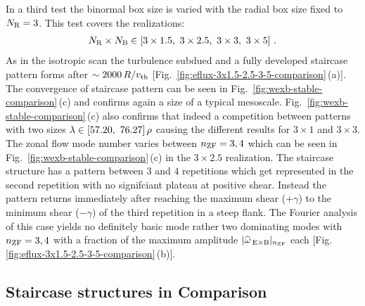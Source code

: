 In a third test the binormal box size is varied with the radial box size fixed to $N_\mathrm{R} = 3$.
This test covers the realizations:
\begin{gather*}
	N_\mathrm{R} \times N_\mathrm{B} \in [3\times1.5,~3\times2.5,~3\times3,~3\times5]~.
\end{gather*}
As in the isotropic scan the turbulence subdued and a fully developed staircase pattern forms after $\sim 2000\,R/v_{\mathrm{th}}$ [Fig.~\ref{fig:eflux-3x1.5-2.5-3-5-comparison}\,(a)]. The convergence of staircase pattern can be seen in Fig.~\ref{fig:wexb-stable-comparison}\,(c) and confirms again a size of a typical mesoscale. Fig.~\ref{fig:wexb-stable-comparison}\,(c) also confirms that indeed a competition between patterns with two sizes $\lambda \in [57.20,~ 76.27]\,\rho$ causing the different results for $3 \times 1$ and $3\times 3$. The zonal flow mode number varies between $n_\mathrm{ZF} = 3,4$ which can be seen in Fig.~\ref{fig:wexb-stable-comparison}\,(c) in the $3\times 2.5$ realization. The staircase structure has a pattern between $3$ and $4$ repetitions which get represented in the second repetition with no signifciant plateau at positive shear. Instead the pattern returns immediately after reaching the maximum shear ($+ \gamma$) to the minimum shear ($- \gamma$) of the third repetition in a steep flank. The Fourier analysis of this case yields no definitely basic mode rather two dominating modes with $n_\mathrm{ZF} = 3, 4$ with a fraction of the maximum amplitude $|\widehat{\omega}_{\mathrm{\:E \times B}}|_{n_\mathrm{ZF}}$ each [Fig. \ref{fig:eflux-3x1.5-2.5-3-5-comparison}\,(b)].
\bigskip

\subsection{Staircase structures in Comparison}
\label{sub:comparisonwexb}

